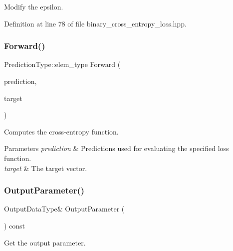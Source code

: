 Modify the epsilon. 



Definition at line 78 of file binary\+\_\+cross\+\_\+entropy\+\_\+loss.\+hpp.

\mbox{\label{classmlpack_1_1ann_1_1BCELoss_ab3640059898ea76c13709b8099316fe8}} 
\subsubsection{Forward()}
{\footnotesize\ttfamily Prediction\+Type\+::elem\+\_\+type Forward (\begin{DoxyParamCaption}\item[{const Prediction\+Type \&}]{prediction,  }\item[{const Target\+Type \&}]{target }\end{DoxyParamCaption})}



Computes the cross-\/entropy function. 


\begin{DoxyParams}{Parameters}
{\em prediction} & Predictions used for evaluating the specified loss function. \\
\hline
{\em target} & The target vector. \\
\hline
\end{DoxyParams}
\mbox{\label{classmlpack_1_1ann_1_1BCELoss_a8bae962cc603d1cab8d80ec78f8d505d}} 
\subsubsection{Output\+Parameter()\hspace{0.1cm}{\footnotesize\ttfamily [1/2]}}
{\footnotesize\ttfamily Output\+Data\+Type\& Output\+Parameter (\begin{DoxyParamCaption}{ }\end{DoxyParamCaption}) const\hspace{0.3cm}{\ttfamily [inline]}}



Get the output parameter. 



